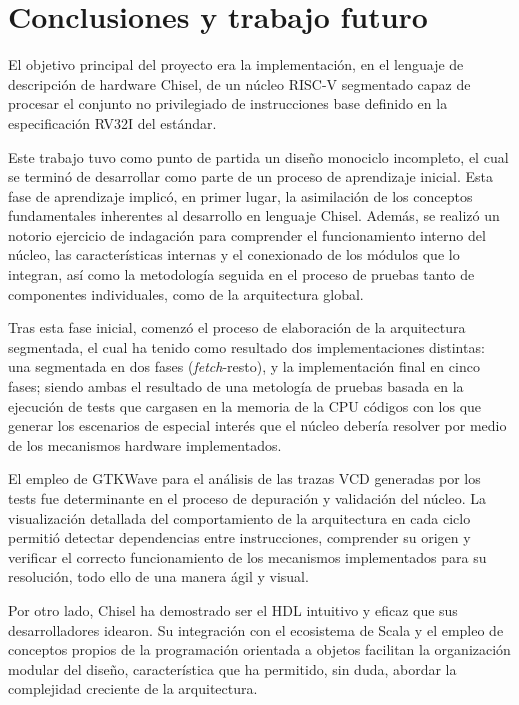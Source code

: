 \chapter{Conclusiones y trabajo futuro}

El objetivo principal del proyecto era la implementación, en el lenguaje de descripción de hardware Chisel, de un núcleo RISC-V segmentado capaz de procesar el conjunto no privilegiado de instrucciones base definido en la especificación RV32I del estándar.

Este trabajo tuvo como punto de partida un diseño monociclo incompleto, el cual se terminó de desarrollar como parte de un proceso de aprendizaje inicial. Esta fase de aprendizaje implicó, en primer lugar, la asimilación de los conceptos fundamentales inherentes al desarrollo en lenguaje Chisel. Además, se realizó un notorio ejercicio de indagación para comprender el funcionamiento interno del núcleo, las características internas y el conexionado de los módulos que lo integran, así como la metodología seguida en el proceso de pruebas tanto de componentes individuales, como de la arquitectura global.

Tras esta fase inicial, comenzó el proceso de elaboración de la arquitectura segmentada, el cual ha tenido como resultado dos implementaciones distintas: una segmentada en dos fases (\textit{fetch}-resto), y la implementación final en cinco fases; siendo ambas el resultado de una metología de pruebas basada en la ejecución de tests que cargasen en la memoria de la CPU códigos con los que generar los escenarios de especial interés que el núcleo debería resolver por medio de los mecanismos hardware implementados.

El empleo de GTKWave para el análisis de las trazas VCD generadas por los tests fue determinante en el proceso de depuración y validación del núcleo. La visualización detallada del comportamiento de la arquitectura en cada ciclo permitió detectar dependencias entre instrucciones, comprender su origen y verificar el correcto funcionamiento de los mecanismos implementados para su resolución, todo ello de una manera ágil y visual.

Por otro lado, Chisel ha demostrado ser el HDL intuitivo y eficaz que sus desarrolladores idearon. Su integración con el ecosistema de Scala y el empleo de conceptos propios de la programación orientada a objetos facilitan la organización modular del diseño, característica que ha permitido, sin duda, abordar la complejidad creciente de la arquitectura.

